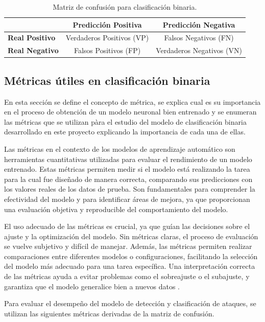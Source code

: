 \begin{table}[h]
\centering
\label{tab:confusion_matrix}
\begin{tabular}{|l|c|c|}
\hline
 & \textbf{Predicción Positiva} & \textbf{Predicción Negativa} \\ \hline
\textbf{Real Positivo} & Verdaderos Positivos (VP) & Falsos Negativos (FN) \\ \hline
\textbf{Real Negativo} & Falsos Positivos (FP) & Verdaderos Negativos (VN) \\ \hline
\end{tabular}
\caption{Matriz de confusión para clasificación binaria.}
\end{table}

\subsection{Métricas útiles en clasificación binaria}  \label{sec.metricas-bin}
En esta sección se define el concepto de métrica, se explica cual es su importancia en el proceso de obtención de un modelo neuronal bien entrenado y se enumeran las métricas que se utilizan pàra el estudio del modelo de clasificación binaria desarrollado en este proyecto explicando la importancia de cada una de ellas.

Las métricas en el contexto de los modelos de aprendizaje automático son herramientas cuantitativas utilizadas para evaluar el rendimiento de un modelo entrenado. Estas métricas permiten medir si el modelo está realizando la tarea para la cual fue diseñado de manera correcta, comparando sus predicciones con los valores reales de los datos de prueba. Son fundamentales para comprender la efectividad del modelo y para identificar áreas de mejora, ya que proporcionan una evaluación objetiva y reproducible del comportamiento del modelo.

El uso adecuado de las métricas es crucial, ya que guían las decisiones sobre el ajuste y la optimización del modelo. Sin métricas claras, el proceso de evaluación se vuelve subjetivo y difícil de manejar. Además, las métricas permiten realizar comparaciones entre diferentes modelos o configuraciones, facilitando la selección del modelo más adecuado para una tarea específica. Una interpretación correcta de las métricas ayuda a evitar problemas como el sobreajuste o el subajuste, y garantiza que el modelo generalice bien a nuevos datos \cite{goodfellow2016deep}.

Para evaluar el desempeño del modelo de detección y clasificación de ataques, se utilizan las siguientes métricas derivadas de la matriz de confusión.


